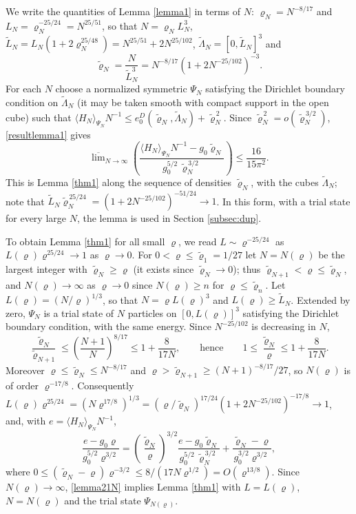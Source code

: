\documentclass[11pt]{article}
\numberwithin{equation}{section}
\newcommand{\beq}{\begin{equation}}
\newcommand{\eeq}{\end{equation}}
\renewcommand\rho\varrho
\theoremstyle{definition}
\begin{document}
We write the quantities of Lemma \ref{lemma1} in terms of $N$: $\rho_N=N^{-8/17}$ and $L_N=\rho_N^{-25/24}=N^{25/51}$, so that $N=\rho_NL_N^3$, $\widetilde L_N=L_N(1+2\rho_N^{25/48})=N^{25/51}+2N^{25/102}$, $\widetilde\Lambda_N=[0,\widetilde L_N]^3$ and
\[
\widetilde\rho_N=\frac{N}{\widetilde L_N^3}=N^{-8/17}\left(1+2N^{-25/102}\right)^{-3}.
\]
For each $N$ choose a normalized symmetric $\Psi_N$ satisfying the Dirichlet boundary condition on $\widetilde\Lambda_N$ (it may be taken smooth with compact support in the open cube) such that
$\langle H_N\rangle_{\Psi_N}N^{-1}\leq e_0^D(\widetilde\rho_N,\widetilde\Lambda_N)+\widetilde\rho_N^{\,2}$. Since $\widetilde\rho_N^{\,2}=o(\widetilde\rho_N^{\,3/2})$, \eqref{resultlemma1} gives
\beq\label{lemma21N}
\overline\lim_{N\to\infty}\left(\frac{\langle H_N\rangle_{\Psi_N}N^{-1}-g_0\widetilde\rho_N}{g_0^{5/2}\,\widetilde\rho_N^{\,3/2}}\right)\leq\frac{16}{15\pi^2}.
\eeq
This is Lemma \ref{thm1} along the sequence of densities $\widetilde\rho_N$, with the cubes $\widetilde\Lambda_N$; note that $\widetilde L_N\widetilde\rho_N^{\,25/24}=(1+2N^{-25/102})^{-51/24}\to1$.
In this form, with a trial state for every large $N$, the lemma is used in Section \ref{subsec:dup}.

To obtain Lemma \ref{thm1} for all small $\rho$, we read $L\sim\rho^{-25/24}$ as $L(\rho)\rho^{25/24}\to1$ as $\rho\to0$.
For $0<\rho\leq\widetilde\rho_1=1/27$ let $N=N(\rho)$ be the largest integer with $\widetilde\rho_N\geq\rho$ (it exists since $\widetilde\rho_N\to0$);
thus $\widetilde\rho_{N+1}<\rho\leq\widetilde\rho_N$, and $N(\rho)\to\infty$ as $\rho\to0$ since $N(\rho)\geq n$ for $\rho\leq\widetilde\rho_n$. Let $L(\rho)=(N/\rho)^{1/3}$, so that $N=\rho L(\rho)^3$ and $L(\rho)\geq\widetilde L_N$.
Extended by zero, $\Psi_N$ is a trial state of $N$ particles on $[0,L(\rho)]^3$ satisfying the Dirichlet boundary condition, with the same energy.
Since $N^{-25/102}$ is decreasing in $N$,
\[
\frac{\widetilde\rho_N}{\widetilde\rho_{N+1}}\leq\left(\frac{N+1}{N}\right)^{8/17}\leq1+\frac{8}{17N},
\qquad\text{hence}\qquad 1\leq\frac{\widetilde\rho_N}{\rho}\leq1+\frac{8}{17N} .
\]
Moreover $\rho\leq\widetilde\rho_N\leq N^{-8/17}$ and $\rho>\widetilde\rho_{N+1}\geq(N+1)^{-8/17}/27$, so $N(\rho)$ is of order $\rho^{-17/8}$. Consequently
$L(\rho)\rho^{25/24}=(N\rho^{17/8})^{1/3}=(\rho/\widetilde\rho_N)^{17/24}(1+2N^{-25/102})^{-17/8}\to1$, and, with $e=\langle H_N\rangle_{\Psi_N}N^{-1}$,
\[
\frac{e-g_0\rho}{g_0^{5/2}\rho^{3/2}}=\left(\frac{\widetilde\rho_N}{\rho}\right)^{3/2}\frac{e-g_0\widetilde\rho_N}{g_0^{5/2}\,\widetilde\rho_N^{\,3/2}}+\frac{\widetilde\rho_N-\rho}{g_0^{3/2}\rho^{3/2}},
\]
where $0\leq(\widetilde\rho_N-\rho)\rho^{-3/2}\leq 8/(17N\rho^{1/2})=O(\rho^{13/8})$.
Since $N(\rho)\to\infty$, \eqref{lemma21N} implies Lemma \ref{thm1} with $L=L(\rho)$, $N=N(\rho)$ and the trial state $\Psi_{N(\rho)}$.
\end{document}
